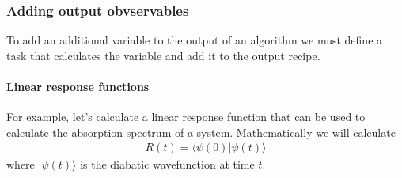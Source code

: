\documentclass[letterpaper,10pt,english]{sphinxmanual}
\begin{document}
\subsubsection{Adding output obvservables}
\label{\detokenize{user_guide/algorithm_dev:adding-output-obvservables}}
\sphinxAtStartPar
To add an additional variable to the output of an algorithm we must define a task that calculates the variable and add it to the output recipe.


\paragraph{Linear response functions}
\label{\detokenize{user_guide/algorithm_dev:linear-response-functions}}
\sphinxAtStartPar
For example, let’s calculate a linear response function that can be used to calculate the absorption spectrum of a system. Mathematically we will calculate
\begin{equation*}
\begin{split}R(t) = \langle \psi(0) \vert \psi(t)\rangle\end{split}
\end{equation*}
\sphinxAtStartPar
where \(\vert \psi(t)\rangle\) is the diabatic wavefunction at time \(t\).

\begin{sphinxVerbatim}[commandchars=\\\{\}]
    
      
       
          
         
      
\end{sphinxVerbatim}
\end{document}
